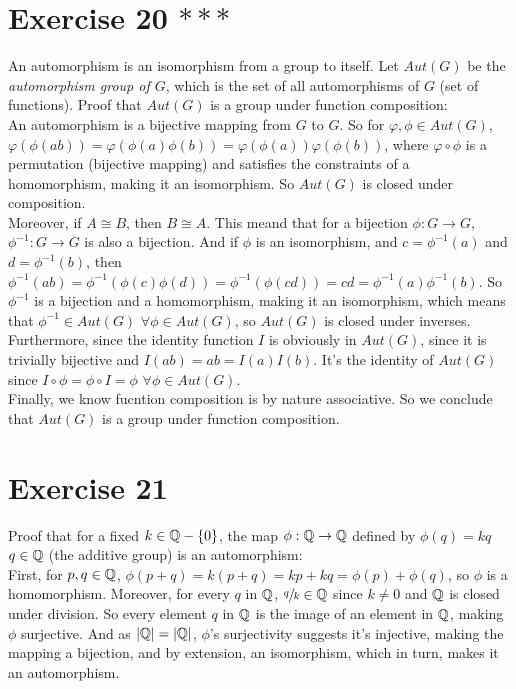 \documentclass[12pt]{article}
\begin{document}
    \section*{Exercise 20 $***$}
    An automorphism is an isomorphism from a group to itself.
    Let $Aut(G)$ be the \textit{automorphism group of $G$},
    which is the set of all automorphisms of $G$ (set of functions).
    Proof that $Aut(G)$ is a group under function composition: \\
    An automorphism is a bijective mapping from $G$ to $G$.
    So for $\varphi, \phi \in Aut(G)$,
    $\varphi(\phi(ab)) = \varphi(\phi(a)\phi(b))
    = \varphi(\phi(a))\varphi(\phi(b))$,
    where $\varphi \circ \phi$ is a permutation (bijective mapping)
    and satisfies the constraints of a homomorphism, making it an
    isomorphism.
    So $Aut(G)$ is closed under composition. \\ 
    Moreover, if $A \cong B$, then $B \cong A$.
    This meand that for a bijection $\phi: G \to G$,
    $\phi^{-1}: G \to G$ is also a bijection.
    And if $\phi$ is an isomorphism,
    and $c = \phi^{-1}(a)$ and $d = \phi^{-1}(b)$,
    then $\phi^{-1}(ab) = \phi^{-1}(\phi(c)\phi(d))
    = \phi^{-1}(\phi(cd))
    = cd
    = \phi^{-1}(a)\phi^{-1}(b)$.
    So $\phi^{-1}$ is a bijection and a homomorphism, 
    making it an isomorphism,
    which means that $\phi^{-1} \in Aut(G)$ $\forall \phi \in Aut(G)$,
    so $Aut(G)$ is closed under inverses. \\
    Furthermore, since the identity function $I$ is obviously in $Aut(G)$,
    since it is trivially bijective
    and $I(ab) = ab = I(a)I(b)$.
    It's the identity of $Aut(G)$
    since $I \circ \phi = \phi \circ I = \phi$ $\forall \phi \in Aut(G)$. \\
    Finally, we know fucntion composition is by nature associative.
    So we conclude that $Aut(G)$ is a group under function composition.


    \section*{Exercise 21}
    Proof that for a fixed $k \in \mathbb{Q} - \{0\}$,
    the map $\phi : \mathbb{Q} \to \mathbb{Q}$ defined by $\phi(q) = kq$ $q \in \mathbb{Q}$ 
    (the additive group) is an automorphism: \\
    First, for $p, q \in \mathbb{Q}$,
    $\phi(p + q) = k(p + q) = kp + kq = \phi(p) + \phi(q)$,
    so $\phi$ is a homomorphism.
    Moreover, for every $q$ in $\mathbb{Q}$, $\sfrac{q}{k} \in \mathbb{Q}$
    since $k \neq 0$ and $\mathbb{Q}$ is closed under division.
    So every element $q$ in $\mathbb{Q}$ is the image of an element in $\mathbb{Q}$,
    making $\phi$ surjective.
    And as $|\mathbb{Q}| = |\mathbb{Q}|$, $\phi$'s surjectivity suggests it's injective,
    making the mapping a bijection,
    and by extension, an isomorphism,
    which in turn, makes it an automorphism.
\end{document}
